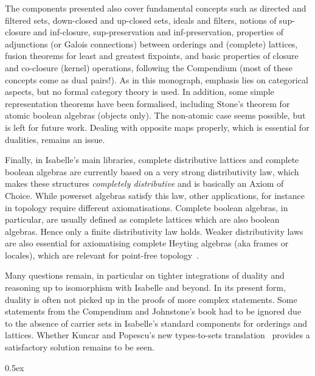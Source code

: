 \documentclass[11pt,a4paper]{article}
\begin{document}
The components presented also cover fundamental concepts such as
directed and filtered sets, down-closed and up-closed sets, ideals and
filters, notions of sup-closure and inf-closure, sup-preservation and
inf-preservation, properties of adjunctions (or Galois connections)
between orderings and (complete) lattices, fusion theorems for least
and greatest fixpoints, and basic properties of closure and co-closure
(kernel) operations, following the Compendium (most of these concepts
come as dual pairs!). As in this monograph, emphasis lies on
categorical aspects, but no formal category theory is used. In
addition, some simple representation theorems have been formalised,
including Stone's theorem for atomic boolean algebras (objects only).
The non-atomic case seems possible, but is left for future
work. Dealing with opposite maps properly, which is essential for
dualities, remains an issue.

Finally, in Isabelle's main libraries, complete distributive lattices
and complete boolean algebras are currently based on a very strong
distributivity law, which makes these structures \emph{completely
  distributive} and is basically an Axiom of Choice.  While powerset
algebras satisfy this law, other applications, for instance in
topology require different axiomatisations.  Complete boolean
algebras, in particular, are usually defined as complete lattices
which are also boolean algebras. Hence only a finite distributivity
law holds. Weaker distributivity laws are also essential for
axiomatising complete Heyting algebras (aka frames or locales), which
are relevant for point-free topology~\cite{Johnstone82}.

Many questions remain, in particular on tighter integrations
of duality and reasoning up to isomorphism with Isabelle and
beyond. In its present form, duality is often not picked up in the proofs
of more complex statements. Some statements from the Compendium and
Johnstone's book had to be ignored due to the absence of carrier sets
in Isabelle's standard components for orderings and lattices. Whether
Kuncar and Popescu's new types-to-sets translation~\cite{Kuncar016}
provides a satisfactory solution remains to be seen.

\parindent 0pt\parskip 0.5ex





\end{document}
